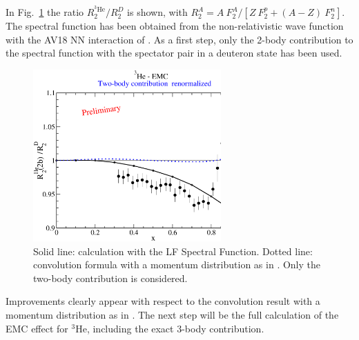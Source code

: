 { In Fig.~\ref{fig:pace} the ratio $R_2^{^3\mathrm{He}}/R_2^D$ is shown, with $R_2^A = A~ F_2^A/[Z ~F_2^p + (A-Z)~F_2^n]$.
The  spectral function has been obtained from the non-relativistic wave function  with the AV18 NN interaction of \cite{Kievsky:1997bg}. As a first step, only
the 2-body contribution 
to the spectral function with the spectator pair  in a {{deuteron state}}
has been used.
 \begin{figure}
\centerline{\includegraphics[width=7.2cm]{plots/emc_018.eps}}
 \caption{Solid line: calculation with the {{LF Spectral Function}}. 
\label{fig:pace}
Dotted line: {convolution formula  with a momentum distribution as in \cite{Oelfke:1990uy}}. Only  the two-body contribution is considered.}
 \end{figure}
{{Improvements clearly appear with respect to the
convolution result with a momentum distribution as in \cite{Oelfke:1990uy}}.
The next step will be the full calculation of the EMC effect for $^3\mathrm{He}$, including the exact
3-body contribution. 
}}

